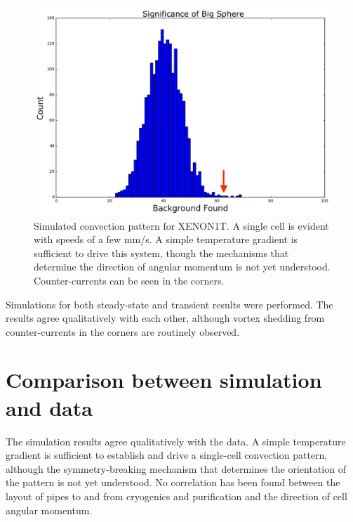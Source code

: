 \begin{figure}[htb]
    \includegraphics[width=\textwidth]{figures/rnveto/BigSphere}
    \caption{Simulated convection pattern for XENON1T. A single cell is evident with speeds of a few mm/s. A simple temperature gradient is sufficient to drive this system, though the mechanisms that determine the direction of angular momentum is not yet understood. Counter-currents can be seen in the corners.}\label{fig:cfd_sample}
\end{figure}

Simulations for both steady-state and transient results were performed. The results agree qualitatively with each other, although vortex shedding from counter-currents in the corners are routinely observed.

\section{Comparison between simulation and data}

The simulation results agree qualitatively with the data. A simple temperature gradient is sufficient to establish and drive a single-cell convection pattern, although the symmetry-breaking mechanism that determines the orientation of the pattern is not yet understood. No correlation has been found between the layout of pipes to and from cryogenics and purification and the direction of cell angular momentum.

